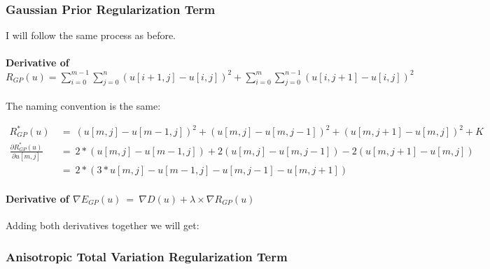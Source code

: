 \documentclass{report}
\begin{document}
			\subsubsection{Gaussian Prior Regularization Term}
			\startsubsection
				I will follow the same process as before.
				\vspace{-0.4cm} \paragraph{Derivative of $R_{GP}(u) = \sum_{i=0}^{m-1} \sum_{j=0}^{n} ( u[i+1,j] - u[i,j] )^2 + \sum_{i=0}^{m} \sum_{j=0}^{n-1} ( u[i,j+1] - u[i,j] )^2$}
				\startsubsection
					\vspace{0.2cm} The naming convention is the same:
				\closesection
				\begin{adjustwidth}{-4em}{}
					\vspace{-0.5cm}
					\begin{align*}
						R_{GP}^*(u) \ & = \ (u[m,j] - u[m-1,j])^2 + (u[m,j] - u[m,j-1])^2 + (u[m,j+1] - u[m,j])^2 + K \\
						\frac{\partial R_{GP}^*(u)}{\partial u[m,j]} \ & = \ 2 * (u[m,j] - u[m-1,j]) + 2 (u[m,j] - u[m,j-1]) - 2 (u[m,j+1] - u[m,j]) \\
						& = \ 2 * (3 * u[m,j] - u[m-1,j] - u[m,j-1] - u[m,j+1])
					\end{align*}
				\end{adjustwidth}
				\vspace{-0.4cm} \paragraph{Derivative of $\nabla E_{GP}(u) \ = \ \nabla D(u) + \lambda \times \nabla R_{GP}(u)$}
				\startsubsection
					Adding both derivatives together we will get:
				\closesection
			\closesection
			\subsubsection{Anisotropic Total Variation Regularization Term}
			\startsubsection
			\closesection
		\closesection
	\closesection
\end{document}
